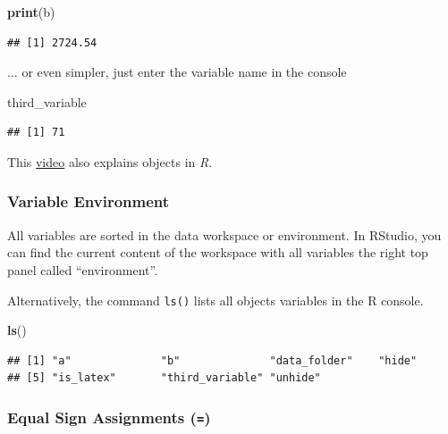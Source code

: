 \documentclass[
]{scrartcl}
\newenvironment{Shaded}{\begin{snugshade}}{\end{snugshade}}
\newcommand{\FunctionTok}[1]{\textcolor[rgb]{0.13,0.29,0.53}{\textbf{#1}}}
\newcommand{\NormalTok}[1]{#1}
\newenvironment{simple}
        {}
        {}
\begin{document}
\begin{Shaded}
\begin{Highlighting}[]
\FunctionTok{print}\NormalTok{(b)}
\end{Highlighting}
\end{Shaded}

\begin{verbatim}
## [1] 2724.54
\end{verbatim}

\(\ldots\) or even simpler, just enter the variable name in the console

\begin{Shaded}
\begin{Highlighting}[]
\NormalTok{third\_variable}
\end{Highlighting}
\end{Shaded}

\begin{verbatim}
## [1] 71
\end{verbatim}

\begin{simple}
This \href{https://vimeo.com/220493412}{video} also explains objects in
\emph{R}.
\end{simple}

\subsubsection{Variable Environment}\label{variable-environment}

All variables are sorted in the data workspace or environment. In
RStudio, you can find the current content of the workspace with all
variables the right top panel called ``environment''.

Alternatively, the command \texttt{ls()} lists all objects variables in the R
console.

\begin{Shaded}
\begin{Highlighting}[]
\FunctionTok{ls}\NormalTok{()}
\end{Highlighting}
\end{Shaded}

\begin{verbatim}
## [1] "a"              "b"              "data_folder"    "hide"          
## [5] "is_latex"       "third_variable" "unhide"
\end{verbatim}

\subsubsection{\texorpdfstring{Equal Sign Assignments (\texttt{=})}{Equal Sign Assignments (=)}}\label{assign}
\end{document}
